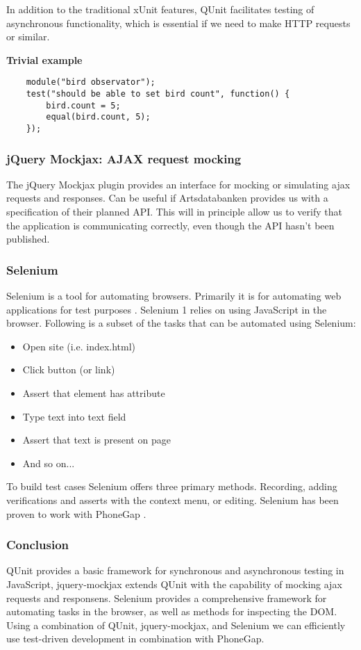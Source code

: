	In addition to the traditional xUnit features, QUnit facilitates testing of
	asynchronous functionality, which is essential if we need to make HTTP
	requests or similar.

	\textbf{Trivial example}

\begin{lstlisting}
	module("bird observator");
	test("should be able to set bird count", function() {
		bird.count = 5;
		equal(bird.count, 5);
	});
\end{lstlisting}

\subsubsection{jQuery Mockjax: AJAX request mocking}

	The jQuery Mockjax plugin provides an interface for mocking or simulating
	ajax requests and responses. \cite{github:jquery-mockjax} Can be useful if Artsdatabanken provides us
	with a specification of their planned API. This will in principle allow us
	to verify that the application is communicating correctly, even though the
	API hasn't been published.

\subsubsection{Selenium}

	Selenium is a tool for automating browsers. Primarily it is for automating
	web applications for test purposes \cite{seleniumhq:home}. Selenium 1 relies
	on using JavaScript in the browser. Following is a subset of the tasks that
	can be automated using Selenium:

	\begin{itemize}
		\item Open site (i.e. index.html)
		\item Click button (or link)
		\item Assert that element has attribute
		\item Type text into text field
		\item Assert that text is present on page
		\item And so on...
	\end{itemize}

	To build test cases Selenium offers three primary methods. Recording, adding
	verifications and asserts with the context menu, or editing. Selenium has
	been proven to work with PhoneGap \cite{phonegap:automatic-test-cases}.

\subsubsection{Conclusion}

	QUnit provides a basic framework for synchronous and asynchronous testing in
	JavaScript, jquery-mockjax extends QUnit with the capability of mocking ajax
	requests and responsens. Selenium provides a comprehensive framework for
	automating tasks in the browser, as well as methods for inspecting the DOM.
	Using a combination of QUnit, jquery-mockjax, and Selenium we can
	efficiently use test-driven development in combination with PhoneGap.
